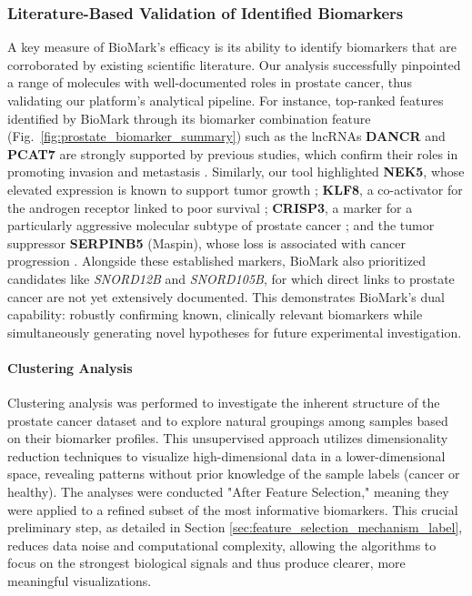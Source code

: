 \documentclass[journal]{IEEEtran}
\begin{document}
\subsubsection{Literature-Based Validation of Identified Biomarkers}
A key measure of BioMark's efficacy is its ability to identify biomarkers that are corroborated by existing scientific literature. Our analysis successfully pinpointed a range of molecules with well-documented roles in prostate cancer, thus validating our platform's analytical pipeline. For instance, top-ranked features identified by BioMark through its biomarker combination feature (Fig.~\ref{fig:prostate_biomarker_summary}) such as the lncRNAs \textbf{DANCR} and \textbf{PCAT7} are strongly supported by previous studies, which confirm their roles in promoting invasion and metastasis \cite{DANCR_prostate_2016, PCAT7_metastasis_2020}. Similarly, our tool highlighted \textbf{NEK5}, whose elevated expression is known to support tumor growth \cite{NEK5_prostate_2025}; \textbf{KLF8}, a co-activator for the androgen receptor linked to poor survival \cite{KLF8_prostate_2013}; \textbf{CRISP3}, a marker for a particularly aggressive molecular subtype of prostate cancer \cite{CRISP3_prostate_2014}; and the tumor suppressor \textbf{SERPINB5} (Maspin), whose loss is associated with cancer progression \cite{SERPINB5_prostate_2010}. Alongside these established markers, BioMark also prioritized candidates like \textit{SNORD12B} and \textit{SNORD105B}, for which direct links to prostate cancer are not yet extensively documented. This demonstrates BioMark's dual capability: robustly confirming known, clinically relevant biomarkers while simultaneously generating novel hypotheses for future experimental investigation.

\paragraph{Clustering Analysis}
Clustering analysis was performed to investigate the inherent structure of the prostate cancer dataset and to explore natural groupings among samples based on their biomarker profiles. This unsupervised approach utilizes dimensionality reduction techniques to visualize high-dimensional data in a lower-dimensional space, revealing patterns without prior knowledge of the sample labels (cancer or healthy). The analyses were conducted "After Feature Selection," meaning they were applied to a refined subset of the most informative biomarkers. This crucial preliminary step, as detailed in Section \ref{sec:feature_selection_mechanism_label}, reduces data noise and computational complexity, allowing the algorithms to focus on the strongest biological signals and thus produce clearer, more meaningful visualizations.
\end{document}
